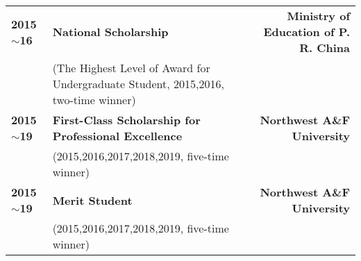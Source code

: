 \begin{longtable}[l]{@{}p{} p{} r}
    \textbf{2015$\sim$16} & \textbf{National Scholarship} & \textbf{Ministry of Education of P. R. China} \\
    & (The Highest Level of Award for Undergraduate Student, 2015,2016, two-time winner) & \\
    \textbf{2015$\sim$19} & \textbf{First-Class Scholarship for Professional Excellence} & \textbf{Northwest A\&F University} \\
    & (2015,2016,2017,2018,2019, five-time winner) & \\
    \textbf{2015$\sim$19} &\textbf{Merit Student} & \textbf{Northwest A\&F University} \\
    & (2015,2016,2017,2018,2019, five-time winner) & \\
\end{longtable}
